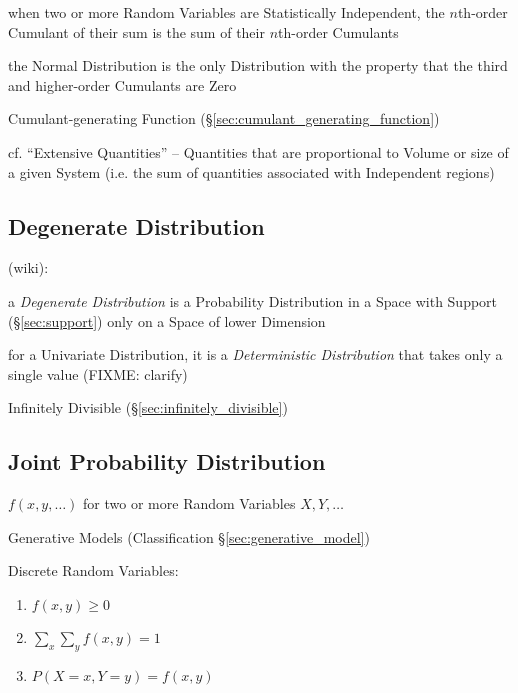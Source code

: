 when two or more Random Variables are Statistically Independent, the $n$th-order
Cumulant of their sum is the sum of their $n$th-order Cumulants

the Normal Distribution is the only Distribution with the property that the
third and higher-order Cumulants are Zero

\fist Cumulant-generating Function (\S\ref{sec:cumulant_generating_function})

cf. ``Extensive Quantities'' -- Quantities that are proportional to Volume or
size of a given System (i.e. the sum of quantities associated with Independent
regions)



\subsection{Degenerate Distribution}\label{sec:degenerate_distribution}

(wiki):

a \emph{Degenerate Distribution} is a Probability Distribution in a Space with
Support (\S\ref{sec:support}) only on a Space of lower Dimension

for a Univariate Distribution, it is a \emph{Deterministic Distribution} that
takes only a single value (FIXME: clarify)

Infinitely Divisible (\S\ref{sec:infinitely_divisible})



\subsection{Joint Probability Distribution}\label{sec:joint_probability}

$f(x,y,\ldots)$ for two or more Random Variables $X,Y,\ldots$

\fist Generative Models (Classification \S\ref{sec:generative_model})

Discrete Random Variables:
\begin{enumerate}
  \item $f(x,y) \geq 0$
  \item $\sum_x \sum_y f(x,y) = 1$
  \item $P(X = x, Y = y) = f(x,y)$
\end{enumerate}

